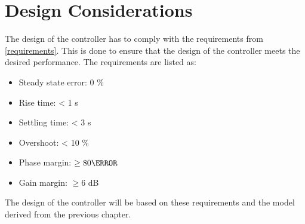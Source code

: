\section{Design Considerations}
The design of the controller has to comply with the requirements from \autoref{requirements}. This is done to ensure that the design of the controller meets the desired performance. The requirements are listed as:\vspace{-0.6 cm}
\begin{itemize}
\item Steady state error: 0 \% \vspace{-0.2 cm}
\item Rise time: < 1 s \vspace{-0.2 cm}
\item Settling time: < 3 s \vspace{-0.2 cm}
\item Overshoot: < 10 \% \vspace{-0.2 cm}
\item Phase margin: $\geq 80 \degree$ \vspace{-0.2 cm}
\item Gain margin: $\geq 6$ dB 
\end{itemize}
The design of the controller will be based on these requirements and the model derived from the previous chapter. 
